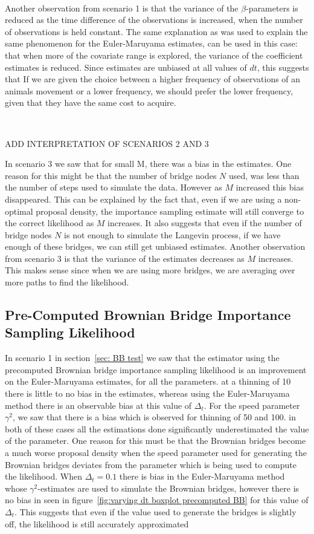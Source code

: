 \

Another observation from scenario 1 is that the variance of the $\beta$-parameters is reduced as the time difference of the observations is increased, when the number of observations is held constant. The same explanation as was used to explain the same phenomenon for the Euler-Maruyama estimates, can be used in this case: that when more of the covariate range is explored, the variance of the coefficient estimates is reduced. Since estimates are unbiased at all values of $dt$, this suggests that If we are given the choice between a higher frequency of observations of an animals movement or a lower frequency, we should prefer the lower frequency, given that they have the same cost to acquire.

\


ADD INTERPRETATION OF SCENARIOS 2 AND 3


In scenario 3 we saw that for small M, there was a bias in the estimates. One reason for this might be that the number of bridge nodes $N$ used, was less than the number of steps used to simulate the data. However as $M$ increased this bias disappeared. This can be explained by the fact that, even if we are using a non-optimal proposal density, the importance sampling estimate will still converge to the correct likelihood as $M$ increases. It also suggests that even if the number of bridge nodes $N$ is not enough to simulate the Langevin process, if we have enough of these bridges, we can still get unbiased estimates. Another observation from scenario 3 is that the variance of the estimates decreases as $M$ increases. This makes sense since when we are using more bridges, we are averaging over more paths to find the likelihood.

\subsection{Pre-Computed Brownian Bridge Importance Sampling Likelihood}

In scenario 1 in section~\ref{sec: BB test} we saw that the estimator using the precomputed Brownian bridge importance sampling likelihood is an improvement on the Euler-Maruyama estimates, for all the parameters. at a thinning of 10 there is little to no bias in the estimates, whereas using the Euler-Maruyama method there is an observable bias at this value of $\Delta_t$. For the speed parameter $\gamma^2$, we saw that there is a bias which is observed for thinning of 50 and 100. in both of these cases all the estimations done significantly underestimated the value of the parameter. One reason for this must be that the Brownian bridges become a much worse proposal density when the speed parameter used for generating the Brownian bridges deviates from the parameter which is being used to compute the likelihood. 
When $\Delta_t=0.1$ there is bias in the Euler-Maruyama method whose $\gamma^2$-estimates are used to simulate the Brownian bridges, however there is no bias in seen in figure~\ref{fig:varying dt boxplot precomputed BB} for this value of $\Delta_t$. This suggests that even if the value used to generate the bridges is slightly off, the likelihood is still accurately approximated


